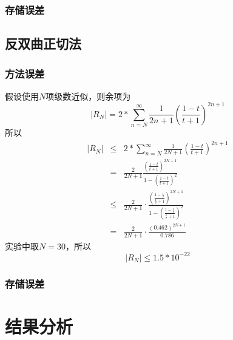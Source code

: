 \documentclass[UTF8,twocolum,titlepage]{ctexart}
\begin{document}
\subsubsection*{存储误差}

\subsection*{反双曲正切法}
\subsubsection*{方法误差}
假设使用$N$项级数近似，则余项为$$\left|R_N\right| =  2*\sum_{n=N}^{\infty}\frac{1}{2n+1}\left(\frac{1-t}{t+1}\right)^{2n+1}$$所以
\begin{eqnarray*}
\left|R_N\right| &\le& 2*\sum_{n=N}^{\infty}\frac{1}{2N+1}\left(\frac{1-t}{t+1}\right)^{2n+1} \\ &=& \frac{2}{2N+1}\frac{\left(\frac{1-t}{t+1}\right)^{2N+1}}{1-\left(\frac{1-t}{t+1}\right)^2}\\&\le& \frac{2}{2N+1}\cdot\frac{\left(\frac{1-\frac{1}{e}}{\frac{1}{e}+1}\right)^{2N+1}}{1-\left(\frac{1-\frac{1}{e}}{\frac{1}{e}+1}\right)^2}\\&=&\frac{2}{2N+1}\cdot\frac{\left(0.462\right)^{2N+1}}{0.786}
\end{eqnarray*}
实验中取$N=30$，所以$$\left|R_N\right| \le 1.5*10^{-22}$$
\subsubsection*{存储误差}

\section*{结果分析}

\newpage
\renewcommand\refname{参考文献}


\end{document}
